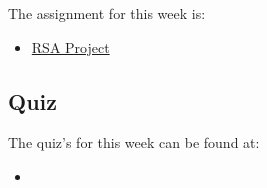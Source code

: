 The assignment for this week is:

\begin{itemize}
    \item \href{https://github.com/QuantumCompiler/CU/tree/main/CSPB%202824%20-%20Discrete%20Structures/RSA%20Project}{RSA Project}
\end{itemize}

\subsection{Quiz}

The quiz's for this week can be found at:

\begin{itemize}
    \item {}
\end{itemize}